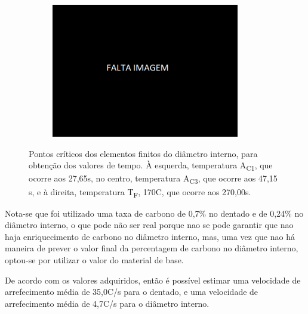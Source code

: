 \begin{figure}[htb]
\begin{subfigure}{.33\textwidth}
        \caption{}
        \label{fig:A1_Dint}
    \end{subfigure}
    \begin{subfigure}{.33\textwidth}
        \centering
        \includegraphics[width = 0.9\textwidth]{Figures/Cap4/Falta_Imagem.png}
        \caption{}
        \label{fig:Tf_Dint}
    \end{subfigure}
    \caption[Pontos críticos dos elementos finitos do diâmetro interno]%
    {Pontos críticos dos elementos finitos do diâmetro interno, para obtenção dos valores de tempo. À esquerda, temperatura A\textsubscript{C1}, que ocorre aos 27,65s, no centro, temperatura A\textsubscript{C3}, que ocorre aos 47,15 s, e à direita, temperatura T\textsubscript{F}, 170\textdegree C, que ocorre aos 270,00s.}
    \label{fig:Diametro}
\end{figure}
\newpage
\par Nota-se que foi utilizado uma taxa de carbono de 0,7\% no dentado e de 0,24\% no diâmetro interno, o que pode não ser real porque nao se pode garantir que nao haja enriquecimento de carbono no diâmetro interno, mas, uma vez que nao há maneira de prever o valor final da percentagem de carbono no diâmetro interno, optou-se por utilizar o valor do material de base.
\par
De acordo com os valores adquiridos, então é possível estimar uma velocidade de arrefecimento média de 35,0\textdegree C/s para o dentado, e uma velocidade de arrefecimento média de 4,7\textdegree C/s para o diâmetro interno.
